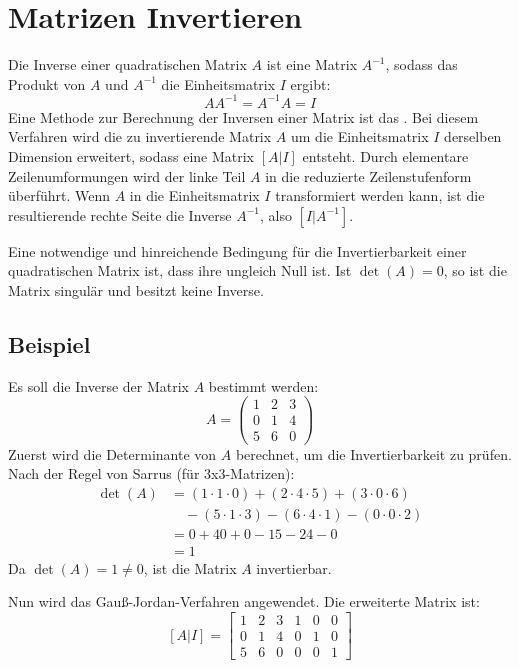 \chapter{Matrizen Invertieren}

Die Inverse einer quadratischen Matrix \(A\) ist eine Matrix \(A^{-1}\), sodass das Produkt von \(A\) und \(A^{-1}\) die Einheitsmatrix \(I\) ergibt:
\[ AA^{-1} = A^{-1}A = I \]
Eine Methode zur Berechnung der Inversen einer Matrix ist das . Bei diesem Verfahren wird die zu invertierende Matrix \(A\) um die Einheitsmatrix \(I\) derselben Dimension erweitert, sodass eine Matrix \([A|I]\) entsteht. Durch elementare Zeilenumformungen wird der linke Teil \(A\) in die reduzierte Zeilenstufenform überführt. Wenn \(A\) in die Einheitsmatrix \(I\) transformiert werden kann, ist die resultierende rechte Seite die Inverse \(A^{-1}\), also \([I|A^{-1}]\).

Eine notwendige und hinreichende Bedingung für die Invertierbarkeit einer quadratischen Matrix ist, dass ihre  ungleich Null ist. Ist \(\det(A) = 0\), so ist die Matrix singulär und besitzt keine Inverse.

\section{Beispiel}

Es soll die Inverse der Matrix \(A\) bestimmt werden:
\[ A = \begin{pmatrix}
1 & 2 & 3 \\
0 & 1 & 4 \\
5 & 6 & 0
\end{pmatrix} \]
Zuerst wird die Determinante von \(A\) berechnet, um die Invertierbarkeit zu prüfen. Nach der Regel von Sarrus (für 3x3-Matrizen):
\begin{align*}
\det(A) &= (1 \cdot 1 \cdot 0) + (2 \cdot 4 \cdot 5) + (3 \cdot 0 \cdot 6) \\
&\quad - (5 \cdot 1 \cdot 3) - (6 \cdot 4 \cdot 1) - (0 \cdot 0 \cdot 2) \\
&= 0 + 40 + 0 - 15 - 24 - 0 \\
&= 1
\end{align*}
Da \(\det(A) = 1 \neq 0\), ist die Matrix \(A\) invertierbar.

Nun wird das Gauß-Jordan-Verfahren angewendet. Die erweiterte Matrix ist:
\[ \left[ A | I \right] = \left[ \begin{array}{ccc|ccc}
1 & 2 & 3 & 1 & 0 & 0 \\
0 & 1 & 4 & 0 & 1 & 0 \\
5 & 6 & 0 & 0 & 0 & 1
\end{array} \right] \]

